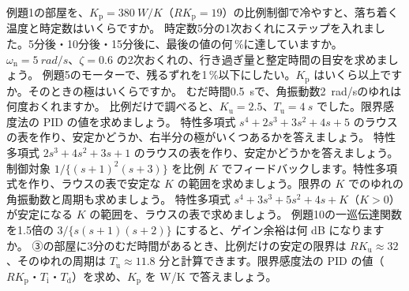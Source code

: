 \bkendproblems
{}
\bkproblem 例題1の部屋を、$K_{\mathrm p}=\qty{380}{W/K}$（$RK_{\mathrm p}=19$）の比例制御で冷やすと、落ち着く温度と時定数はいくらですか。
\bkproblem 時定数5分の1次おくれにステップを入れました。5分後・10分後・15分後に、最後の値の何\,\%に達していますか。
\bkproblem $\omega_{\mathrm n}=\qty{5}{rad/s}$、$\zeta=0.6$ の2次おくれの、行き過ぎ量と整定時間の目安を求めましょう。
\bkproblem 例題5のモーターで、残るずれを1\,\%以下にしたい。$K_{\mathrm p}$ はいくら以上ですか。そのときの極はいくらですか。
\bkproblem むだ時間\qty{0.5}{s}で、角振動数\qty{2}{rad/s}のゆれは何度おくれますか。
\bkproblem 比例だけで調べると、$K_{\mathrm u}=2.5$、$T_{\mathrm u}=\qty{4}{s}$ でした。限界感度法の PID の値を求めましょう。
\bkproblem 特性多項式 $s^4+2s^3+3s^2+4s+5$ のラウスの表を作り、安定かどうか、右半分の極がいくつあるかを答えましょう。
\bkproblem 特性多項式 $2s^3+4s^2+3s+1$ のラウスの表を作り、安定かどうかを答えましょう。
\bkproblem 制御対象 $1/\{(s+1)^2(s+3)\}$ を比例 $K$ でフィードバックします。特性多項式を作り、ラウスの表で安定な $K$ の範囲を求めましょう。限界の $K$ でのゆれの角振動数と周期も求めましょう。
\bkproblem 特性多項式 $s^4+3s^3+5s^2+4s+K$（$K>0$）が安定になる $K$ の範囲を、ラウスの表で求めましょう。
\bkproblem 例題10の一巡伝達関数を1.5倍の $3/\{s(s+1)(s+2)\}$ にすると、ゲイン余裕は何 dB になりますか。
\bkproblem ③の部屋に3分のむだ時間があるとき、比例だけの安定の限界は $RK_{\mathrm u}\approx32$、そのゆれの周期は $T_{\mathrm u}\approx11.8$ 分と計算できます。限界感度法の PID の値（$RK_{\mathrm p}$・$T_{\mathrm i}$・$T_{\mathrm d}$）を求め、$K_{\mathrm p}$ を W/K で答えましょう。

